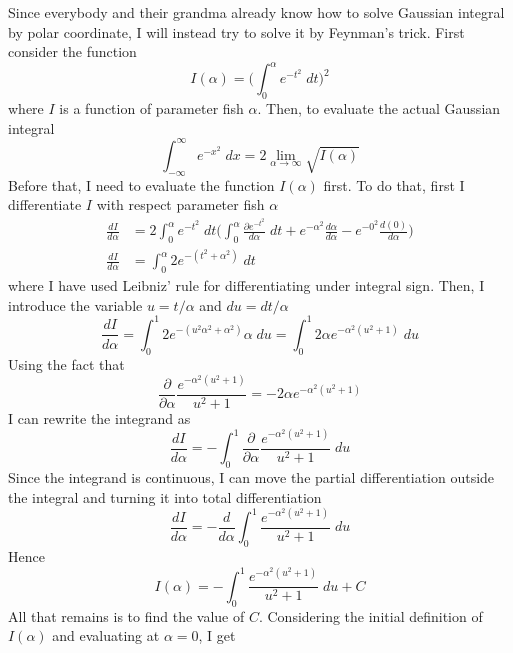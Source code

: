 \documentclass[../../main.tex]{subfiles}
\begin{document}
Since everybody and their grandma already know how to solve Gaussian integral by polar coordinate, I will instead try to solve it by Feynman's trick. First consider the function
\begin{equation*}
    I(\alpha)=\biggl(\int_{0}^{\alpha}e^{-t^2}\;dt\biggr)^2
\end{equation*}
where $I$ is a function of parameter fish $\alpha$. Then, to evaluate the actual Gaussian integral
\begin{equation*}
    \int_{-\infty}^{\infty}e^{-x^2}\;dx=2\lim_{\alpha\rightarrow\infty}\sqrt{I(\alpha)}
\end{equation*}
Before that, I need to evaluate the function $I(\alpha)$ first. To do that, first I differentiate $I$ with respect parameter fish $\alpha$
\begin{align*}
    \frac{dI}{d\alpha}&=2\int_{0}^{\alpha}e^{-t^2}\;dt\biggl(\int_{0}^{\alpha}\frac{\partial e^{-t^2}}{d\alpha}\;dt+e^{-\alpha^2}\frac{d\alpha}{d\alpha}-e^{-0^2}\frac{d(0)}{d\alpha}\biggr)\\
    \frac{dI}{d\alpha}&=\int_{0}^{\alpha}2e^{-(t^2+\alpha^2)}\;dt
\end{align*}
where I have used Leibniz' rule for differentiating under integral sign. Then, I introduce the variable $u=t/\alpha$ and $du=dt/\alpha$
\begin{equation*}
    \frac{dI}{d\alpha}=\int_{0}^{1}2e^{-(u^2\alpha^2+\alpha^2)}\alpha\;du=\int_{0}^{1}2\alpha e^{-\alpha^2(u^2+1)}\;du
\end{equation*}
Using the fact that
\begin{equation*}
    \frac{\partial}{\partial \alpha}\frac{e^{-\alpha^2(u^2+1)}}{u^2+1}=-2\alpha e^{-\alpha^2(u^2+1)}
\end{equation*}
I can rewrite the integrand as 
\begin{equation*}
    \frac{dI}{d\alpha}=-\int_{0}^{1}\frac{\partial}{\partial \alpha}\frac{e^{-\alpha^2(u^2+1)}}{u^2+1}\;du
\end{equation*}
Since the integrand is continuous, I can move the partial differentiation outside the integral and turning it into total differentiation
\begin{equation*}
    \frac{dI}{d\alpha}=-\frac{d}{d\alpha}\int_{0}^{1}\frac{e^{-\alpha^2(u^2+1)}}{u^2+1}\;du
\end{equation*}
Hence
\begin{equation*}
    I(\alpha)=-\int_{0}^{1}\frac{e^{-\alpha^2(u^2+1)}}{u^2+1}\;du+C
\end{equation*}
All that remains is to find the value of $C$. Considering the initial definition of $I(\alpha)$ and evaluating at $\alpha=0$, I get 
\end{document}
